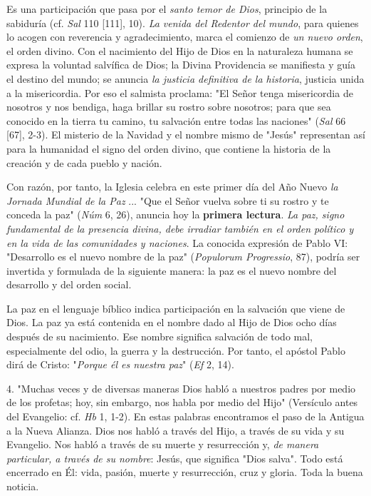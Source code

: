 Es una participación que pasa por el \emph{santo temor de Dios},
principio de la sabiduría (cf. \emph{Sal} 110 {[}111{]}, 10). \emph{La
	venida del Redentor del mundo}, para quienes lo acogen con reverencia y
agradecimiento, marca el comienzo de \emph{un nuevo orden}, el orden
divino. Con el nacimiento del Hijo de Dios en la naturaleza humana se
expresa la voluntad salvífica de Dios; la Divina Providencia se
manifiesta y guía el destino del mundo; se anuncia \emph{la justicia
	definitiva de la historia}, justicia unida a la misericordia. Por eso el
salmista proclama: "El Señor tenga misericordia de nosotros y nos
bendiga, haga brillar su rostro sobre nosotros; para que sea conocido en
la tierra tu camino, tu salvación entre todas las naciones" (\emph{Sal}
66 {[}67{]}, 2-3). El misterio de la Navidad y el nombre mismo de
"Jesús" representan así para la humanidad el signo del orden divino, que
contiene la historia de la creación y de cada pueblo y nación.

Con razón, por tanto, la Iglesia celebra en este primer día del Año
Nuevo \emph{la Jornada Mundial de la Paz} ... "Que el Señor vuelva sobre
ti su rostro y te conceda la paz" (\emph{Núm} 6, 26), anuncia hoy la
\textbf{primera lectura}. \emph{La paz, signo fundamental de la
	presencia divina, debe irradiar también en el orden político y en la
	vida de las comunidades y naciones}. La conocida expresión de Pablo VI:
"Desarrollo es el nuevo nombre de la paz" (\emph{Populorum Progressio},
87), podría ser invertida y formulada de la siguiente manera: la paz es
el nuevo nombre del desarrollo y del orden social.

La paz en el lenguaje bíblico indica participación en la salvación que
viene de Dios. La paz ya está contenida en el nombre dado al Hijo de
Dios ocho días después de su nacimiento. Ese nombre significa salvación
de todo mal, especialmente del odio, la guerra y la destrucción. Por
tanto, el apóstol Pablo dirá de Cristo: "\emph{Porque él es nuestra
	paz}" (\emph{Ef} 2, 14).

4. "Muchas veces y de diversas maneras Dios habló a nuestros padres por
medio de los profetas; hoy, sin embargo, nos habla por medio del Hijo"
(Versículo antes del Evangelio: cf. \emph{Hb} 1, 1-2). En estas palabras
encontramos el paso de la Antigua a la Nueva Alianza. Dios nos habló a
través del Hijo, a través de su vida y su Evangelio. Nos habló a través
de su muerte y resurrección y, \emph{de manera particular, a través de
	su nombre}: Jesús, que significa "Dios salva". Todo está encerrado en
Él: vida, pasión, muerte y resurrección, cruz y gloria. Toda la buena
noticia.

